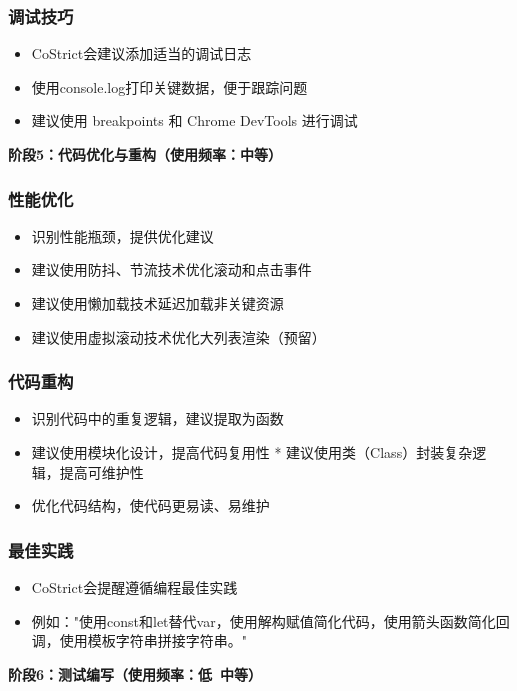 ﻿\documentclass[12pt,a4paper]{article}
\begin{document}
\subsubsection{调试技巧}
\begin{itemize}
    \item CoStrict会建议添加适当的调试日志
    \item 使用console.log打印关键数据，便于跟踪问题
    \item 建议使用 breakpoints 和 Chrome DevTools 进行调试
\end{itemize}

\textbf{阶段5：代码优化与重构（使用频率：中等）}

\subsubsection{性能优化}
\begin{itemize}
    \item 识别性能瓶颈，提供优化建议
    \item 建议使用防抖、节流技术优化滚动和点击事件
    \item 建议使用懒加载技术延迟加载非关键资源
    \item 建议使用虚拟滚动技术优化大列表渲染（预留）
\end{itemize}

\subsubsection{代码重构}
\begin{itemize}
    \item 识别代码中的重复逻辑，建议提取为函数
    \item 建议使用模块化设计，提高代码复用性
    * 建议使用类（Class）封装复杂逻辑，提高可维护性
    \item 优化代码结构，使代码更易读、易维护
\end{itemize}

\subsubsection{最佳实践}
\begin{itemize}
    \item CoStrict会提醒遵循编程最佳实践
    \item 例如："使用const和let替代var，使用解构赋值简化代码，使用箭头函数简化回调，使用模板字符串拼接字符串。"
\end{itemize}

\textbf{阶段6：测试编写（使用频率：低~中等）}
\end{document}
